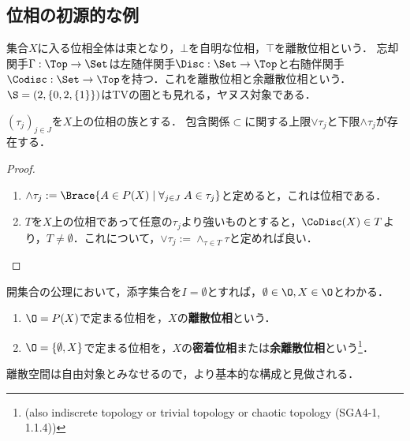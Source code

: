 \documentclass[uplatex,dvipdfmx]{jsreport}
\begin{document}
\subsection{位相の初源的な例}

\begin{tcolorbox}[colframe=ForestGreen, colback=ForestGreen!10!white, breakable]
    集合$X$に入る位相全体は束となり，$\bot$を自明な位相，$\top$を離散位相という．
    忘却関手$\Gamma:\Top\to\Set$は左随伴関手$\Disc:\Set\to\Top$と右随伴関手$\Codisc:\Set\to\Top$を持つ．これを離散位相と余離散位相という．
    $\S=(2,\{0,2,\{1\}\})$はTVの圏とも見れる，ヤヌス対象である．
\end{tcolorbox}

\begin{proposition}
    $(\tau_j)_{j\in J}$を$X$上の位相の族とする．
    包含関係$\subset$に関する上限$\lor\tau_j$と下限$\land\tau_j$が存在する．
\end{proposition}
\begin{proof}\mbox{}
    \begin{enumerate}
        \item $\land\tau_j:=\Brace{A\in P(X)\mid \forall_{j\in J}\;A\in\tau_j}$と定めると，これは位相である．
        \item $T$を$X$上の位相であって任意の$\tau_j$より強いものとすると，$\CoDisc(X)\in T$より，$T\ne\emptyset$．これについて，$\lor\tau_j:=\land_{\tau\in T}\tau$と定めれば良い．
    \end{enumerate}
\end{proof}

\begin{definition}
    開集合の公理において，添字集合を$I=\emptyset$とすれば，$\emptyset\in\O,X\in\O$とわかる．
    \begin{enumerate}
        \item $\O=P(X)$で定まる位相を，$X$の\textbf{離散位相}という．
        \item $\O=\{\emptyset,X\}$で定まる位相を，$X$の\textbf{密着位相}または\textbf{余離散位相}という\footnote{(also indiscrete topology or trivial topology or chaotic topology (SGA4-1, 1.1.4))}．
    \end{enumerate}
    離散空間は自由対象とみなせるので，より基本的な構成と見做される．
\end{definition}
\end{document}

